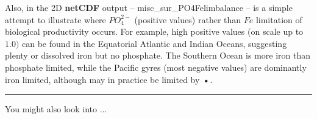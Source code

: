 \vspace{1mm}
Also, in the  2D \textbf{netCDF} output -- \textsf{\footnotesize misc\_sur\_PO4Felimbalance} -- is a simple attempt to illustrate where \(PO^{2-}_{4}\) (positive values) rather than \(Fe\) limitation of biological productivity occurs. For example, high positive values (on scale up to \(1.0)\) can be found in the Equatorial Atlantic and Indian Oceans, suggesting plenty or dissolved iron but no phosphate. The Southern Ocean is more iron than phosphate limited, while the Pacific gyres (most negative values) are dominantly iron limited, although may in practice be limited by \textbf{•}.

\vspace{1mm}
\noindent\rule{4cm}{0.1mm}
\vspace{2mm}

\noindent You might also look into ...

